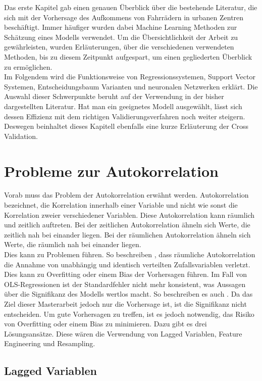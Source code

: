 \documentclass[a4paper,12pt]{thesis}
\begin{document}
Das erste Kapitel gab einen genauen Überblick über die bestehende Literatur, die sich mit der Vorhersage des Aufkommens von Fahrrädern in urbanen Zentren beschäftigt. Immer häufiger wurden dabei Machine Learning Methoden zur Schätzung eines Modells verwendet. Um die Übersichtlichkeit der Arbeit zu gewährleisten, wurden Erläuterungen, über die verschiedenen verwendeten Methoden, bis zu diesem Zeitpunkt aufgespart, um einen gegliederten Überblick zu ermöglichen.\\
Im Folgendem wird die Funktionsweise von Regressionssystemen, Support Vector Systemen, Entscheidungsbaum Varianten und neuronalen Netzwerken erklärt. Die Auswahl dieser Schwerpunkte beruht auf der Verwendung in der bisher dargestellten Literatur. Hat man ein geeignetes Modell ausgewählt, lässt sich dessen Effizienz mit dem richtigen Validierungsverfahren noch weiter steigern. Deswegen beinhaltet dieses Kapitell ebenfalls eine kurze Erläuterung der Cross Validation.

\section{Probleme zur Autokorrelation}

Vorab muss das Problem der Autokorrelation erwähnt werden. Autokorrelation bezeichnet, die Korrelation innerhalb einer Variable und nicht wie sonst die Korrelation zweier verschiedener Variablen. Diese Autokorrelation kann räumlich und zeitlich auftreten. Bei der zeitlichen Autokorrelation ähneln sich Werte, die zeitlich nah bei einander liegen. Bei der räumlichen Autokorrelation ähneln sich Werte, die räumlich nah bei einander liegen.\\ 
Dies kann zu Problemen führen. So beschreiben \cite{LiuAutocorrelation2022}, dass räumliche Autokorrelation die Annahme von unabhängig und identisch verteilten Zufallsvariablen verletzt. Dies kann zu Overfitting oder einem Bias der Vorhersagen führen. Im Fall von OLS-Regressionen ist der Standardfehler nicht mehr konsistent, was Aussagen über die Signifikanz des Modells wertlos macht. So beschreiben es auch \cite{Stock2015b}. Da das Ziel dieser Masterarbeit jedoch nur die Vorhersage ist, ist die Signifikanz nicht entscheiden. Um gute Vorhersagen zu treffen, ist es jedoch notwendig, das Risiko von Overfitting oder einem Bias zu minimieren. Dazu gibt es drei Lösungsansätze. Diese wären die Verwendung von Lagged Variablen, Feature Engineering und Resampling.\\

\subsection{Lagged Variablen}
\end{document}
